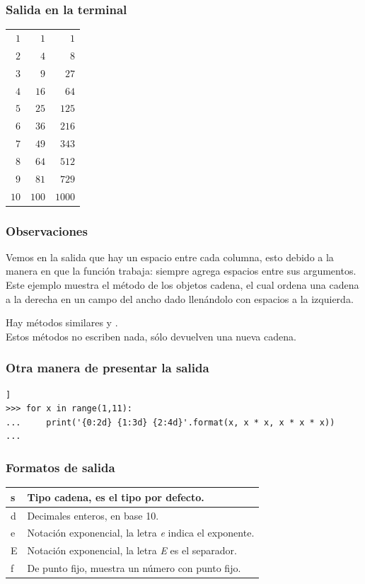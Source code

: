 \begin{frame}
\frametitle{Salida en la terminal}
\fontsize{10}{10}\selectfont
\begin{table}
\begin{tabular}{ r r r}
$1$ & $1$ &  $1$ \\
$2$ & $4$ &  $8$ \\
$3$ & $9$ &  $27$ \\
$4$ & $16$ & $64$\\
$5$ & $25$ & $125$ \\
$6$ & $36$ & $216$ \\
$7$ & $49$ & $343$ \\
$8$ & $64$ & $512$ \\
$9$ & $81$ & $729$ \\
$10$ & $100$ & $1000$
\end{tabular}
\end{table}  
\end{frame}
\begin{frame}
\frametitle{Observaciones}
Vemos en la salida que hay un espacio entre cada columna, esto debido a la manera en que la función  trabaja: siempre agrega espacios entre sus argumentos.
\\
\bigskip
\pause
Este ejemplo muestra el método  de los objetos cadena, el cual ordena una cadena a la derecha en un campo del ancho dado llenándolo con espacios a la izquierda. 
\end{frame}
\begin{frame}
Hay métodos similares  y  .
\\
\bigskip
Estos métodos no escriben nada, sólo devuelven una nueva cadena.
\end{frame}	
\begin{frame}[fragile]
\frametitle{Otra manera de presentar la salida}
\begin{lstlisting}[numbers=none, basicstyle=\linespread{1.2}\ttfamily\small, columns=fullflexible]]
>>> for x in range(1,11):
...     print('{0:2d} {1:3d} {2:4d}'.format(x, x * x, x * x * x))
...
\end{lstlisting}
\end{frame}
\begin{frame}
\frametitle{Formatos de salida}
\begin{table}
\fontsize{12}{12}\selectfont
\begin{tabular}{l | l}
s & Tipo cadena, es el tipo por defecto. \\ \hline
d & Decimales enteros, en base 10. \\ \hline
e & Notación exponencial, la letra \emph{e} indica el exponente. \\ \hline
E & Notación exponencial, la letra \emph{E} es el separador. \\ \hline
f & De punto fijo, muestra un número con punto fijo.
\end{tabular}
\end{table}
\end{frame}
